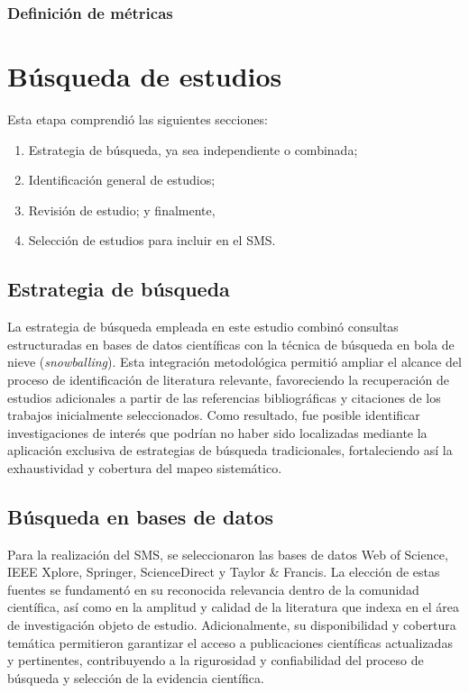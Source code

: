 \subsubsection{Definición de métricas}



\newpage
\section{Búsqueda de estudios}

Esta etapa comprendió las siguientes secciones:
\begin{enumerate}
	\item Estrategia de búsqueda, ya sea independiente o combinada;
	\item Identificación general de estudios;
	\item Revisión de estudio; y finalmente,
	\item Selección de estudios para incluir en el \ac{SMS}.
\end{enumerate}


\subsection{Estrategia de búsqueda}\label{subsec:estrategia-busqueda}

La estrategia de búsqueda empleada en este estudio combinó consultas estructuradas en bases de datos científicas con la técnica de búsqueda en bola de nieve (\textit{snowballing}). Esta integración metodológica permitió ampliar el alcance del proceso de identificación de literatura relevante, favoreciendo la recuperación de estudios adicionales a partir de las referencias bibliográficas y citaciones de los trabajos inicialmente seleccionados. Como resultado, fue posible identificar investigaciones de interés que podrían no haber sido localizadas mediante la aplicación exclusiva de estrategias de búsqueda tradicionales, fortaleciendo así la exhaustividad y cobertura del mapeo sistemático.


\subsection{Búsqueda en bases de datos}\label{subsec:busqueda-bases-datos}

Para la realización del \ac{SMS}, se seleccionaron las bases de datos Web of Science, IEEE Xplore, Springer, ScienceDirect y Taylor \& Francis. La elección de estas fuentes se fundamentó en su reconocida relevancia dentro de la comunidad científica, así como en la amplitud y calidad de la literatura que indexa en el área de investigación objeto de estudio. Adicionalmente, su disponibilidad y cobertura temática permitieron garantizar el acceso a publicaciones científicas actualizadas y pertinentes, contribuyendo a la rigurosidad y confiabilidad del proceso de búsqueda y selección de la evidencia científica.


